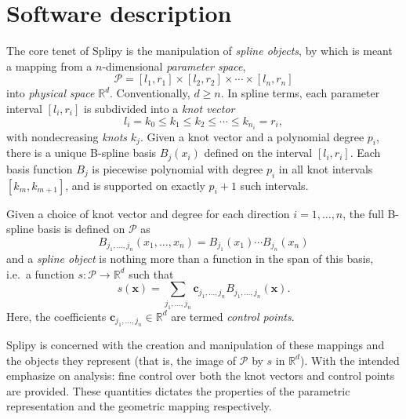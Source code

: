 \documentclass[preprint,12pt, a4paper]{elsarticle}
\begin{document}
\section{Software description}
\label{sec:description}

The core tenet of Splipy is the manipulation of \emph{spline objects}, by which is meant a mapping from a $n$-dimensional \emph{parameter space},
\begin{equation}
  \label{eqn:paramspace}
  \mathcal{P} = [l_1, r_1] \times [l_2, r_2] \times \cdots \times [l_n, r_n]
\end{equation}
into \emph{physical space} $\mathbb{R}^d$.
Conventionally, $d \geq n$.
In spline terms, each parameter interval $[l_i, r_i]$ is subdivided into a \emph{knot vector}
\begin{equation}
  \label{eqn:knotvector}
  l_i = k_0 \leq k_1 \leq k_2 \leq \cdots \leq k_{n_i} = r_i,
\end{equation}
with nondecreasing \emph{knots} $k_j$.
Given a knot vector and a polynomial degree $p_i$, there is a unique B-spline basis $B_j(x_i)$ defined on the interval $[l_i, r_i]$.
Each basis function $B_j$ is piecewise polynomial with degree $p_i$ in all knot intervals $[k_m, k_{m+1}]$, and is supported on exactly $p_i+1$ such intervals.

Given a choice of knot vector and degree for each direction $i=1,\ldots,n$, the full B-spline basis is defined on $\mathcal{P}$ as
\begin{equation}
  \label{eqn:bspline-multi}
  B_{j_1,\ldots,j_n}(x_1,\ldots,x_n) = B_{j_1}(x_1) \cdots B_{j_n}(x_n)
\end{equation}
and a \emph{spline object} is nothing more than a function in the span of this basis, i.e.~a function $s: \mathcal{P} \to \mathbb{R}^d$ such that
\begin{equation}
  \label{eqn:splineobj}
  s(\bm x) = \sum_{j_1, \ldots, j_n} \bm c_{j_1, \ldots, j_n} B_{j_1, \ldots, j_n}(\bm x).
\end{equation}
Here, the coefficients $\bm c_{j_1, \ldots, j_n} \in \mathbb{R}^d$ are termed \emph{control points}.

Splipy is concerned with the creation and manipulation of these mappings and the objects they represent (that is, the image of $\mathcal{P}$ by $s$ in $\mathbb{R}^d$).
With the intended emphasize on analysis: fine control over both the knot vectors and control points are provided.
These quantities dictates the properties of the parametric representation and the geometric mapping respectively.
\end{document}
